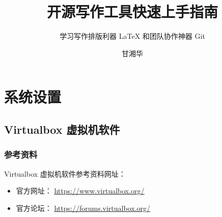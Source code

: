\documentclass[
    11pt,
    base=hide,
    cite=authoryear,
    device=phone,
    lang=cn,
    mode=simple,
    result=answer,
    toc=onecol,
]{elegantbook_sierxue}
\title{开源写作工具快速上手指南}
\subtitle{学习写作排版利器 \LaTeX{} 和团队协作神器 Git}
\author{甘湘华}
\institute{西南财经大学} %
\date{\zhtoday}
\begin{document}
\maketitle

\setcounter{tocdepth}{2}
\tableofcontents

\mainmatter%
\hypersetup{pageanchor=true}

\chapter{系统设置}%
\label{cha:settings-system}

\section{Virtualbox 虚拟机软件}%
\label{sec:vbox}

\subsection{参考资料}%
\label{sub:vbox-refs}

Virtualbox 虚拟机软件参考资料网址：
\begin{itemize}
    \item 官方网址： \href{https://www.virtualbox.org/}{https://www.virtualbox.org/}
    \item 官方论坛： \href{https://forums.virtualbox.org/}{https://forums.virtualbox.org/}
\end{itemize}
\end{document}
